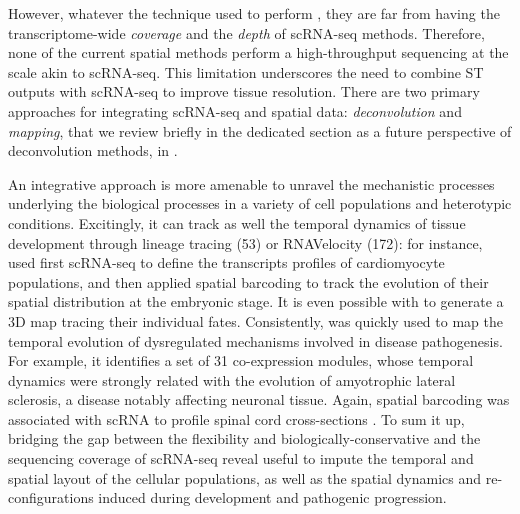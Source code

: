 However, whatever the technique used to perform , they are far from having the transcriptome-wide \textit{coverage} and the \textit{depth} of scRNA-seq methods. Therefore, none of the current spatial methods perform a high-throughput sequencing at the scale akin to scRNA-seq. This limitation underscores the need to combine ST outputs with scRNA-seq to improve tissue resolution. There are two primary approaches for integrating scRNA-seq and spatial data: \textit{deconvolution} and \textit{mapping}, that we review briefly in the dedicated section as a future perspective of deconvolution methods, in . 

An integrative approach is more amenable to unravel the mechanistic processes underlying the biological processes in a variety of cell populations and heterotypic conditions. Excitingly, it can track as well the temporal dynamics of tissue development through \gls{lineage tracing} (53) or RNAVelocity (172): for instance, \autocite{asp_etal19} used first scRNA-seq to define the transcripts profiles of cardiomyocyte populations, and then applied spatial barcoding to track the evolution of their spatial distribution at the embryonic stage. It is even possible with  to generate a 3D map tracing their individual fates. Consistently,  was quickly used to map the temporal evolution of dysregulated mechanisms involved in disease pathogenesis. For example, it identifies a set of 31 co-expression modules, whose temporal dynamics were strongly related with the evolution of amyotrophic lateral sclerosis, a disease notably affecting neuronal tissue. Again, spatial barcoding was associated with scRNA to profile spinal cord cross-sections \autocite{maniatis_etal19}. To sum it up, bridging the gap between the flexibility and biologically-conservative  and the sequencing coverage of scRNA-seq reveal useful to impute the temporal and spatial layout of the cellular populations, as well as the spatial dynamics and re-configurations induced during development and pathogenic progression.



